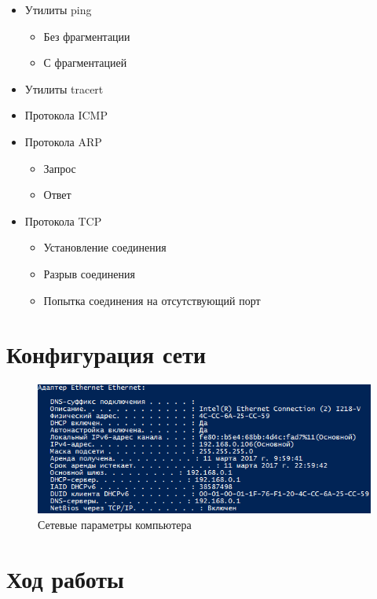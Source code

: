 \documentclass[14pt,a4paper,report]{report}
\begin{document}
\begin{itemize}
	\item Утилиты ping
		\begin{itemize}
			\item Без фрагментации
			\item С фрагментацией
		\end{itemize}
	\item Утилиты tracert
	\item Протокола ICMP
	\item Протокола ARP
		\begin{itemize}
			\item Запрос
			\item Ответ
		\end{itemize}
	\item Протокола TCP
		\begin{itemize}
			\item Установление соединения
			\item Разрыв соединения
			\item Попытка соединения на отсутствующий порт
		\end{itemize}
\end{itemize}

\section{Конфигурация сети}

\begin{figure}[h!]
	\centering
	\includegraphics[scale = 1.1]{images/config.png}
	
	\caption{Сетевые параметры компьютера}
	\label{image:1}
\end{figure}

\clearpage

\section{Ход работы}
\end{document}
